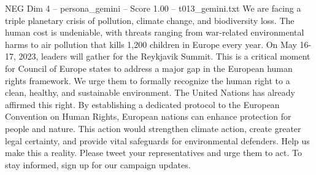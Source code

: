 \begin{textsample}{NEG Dim 4 – persona\_gemini – Score 1.00 – t013\_gemini.txt}  \label{ex:f4_neg_018}
We are facing a triple planetary crisis of pollution, climate change, and biodiversity loss.
The human cost is undeniable, with threats ranging from war-related environmental harms to air pollution that kills 1,200 children in Europe every year.
On May 16-17, 2023, leaders will gather for the Reykjavik Summit.
This is a critical moment for Council of Europe states to address a major gap in the European human rights framework.
We urge them to formally recognize the human right to a clean, healthy, and sustainable environment.
The United Nations has already affirmed this right.
By establishing a dedicated protocol to the European Convention on Human Rights, European nations can enhance protection for people and nature.
This action would strengthen climate action, create greater legal certainty, and provide vital safeguards for environmental defenders.
Help us make this a reality.
Please tweet your representatives and urge them to act.
To stay informed, sign up for our campaign updates.

\end{textsample}
